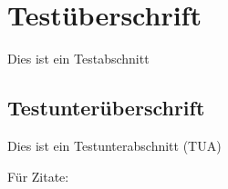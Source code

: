 \section{Testüberschrift} 
%
Dies ist ein Testabschnitt

\subsection{Testunterüberschrift} 
%
Dies ist ein Testunterabschnitt (TUA) 




Für Zitate: \cite{Kurose12}